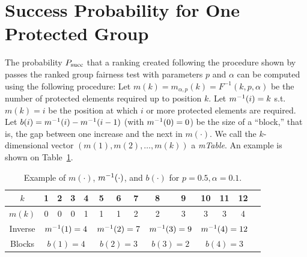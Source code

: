 \section{Success Probability for One Protected Group}\label{subsubsec:adjustment-binomial}

The probability $P_{\operatorname{succ}}$ that a ranking created following the procedure shown by~\citet{yang2016measuring} passes the ranked group fairness test with parameters $p$ and $\alpha$ can be computed using the following procedure:
%
Let $m(k) = m_{\alpha,p}(k) = F^{-1}(k,p,\alpha)$ be the number of protected elements required up to position $k$.
%
Let $m^{-1}(i) = k$ s.t. $m(k) = i$ be the position at which $i$ or more protected elements are required.
%
Let $b(i) = m^{-1}(i) - m^{-1}(i-1)$ (with $m^{-1}(0) = 0$) be the size of a ``block,'' that is, the gap between one increase and the next in $m(\cdot)$.
%
We call the $k$-dimensional vector $(m(1), m(2), \ldots , m(k))$ a \emph{mTable}.
%
An example is shown on Table~\ref{tbl:05:example_blocks}.
%
\begin{table}[ht!]
	\centering
	\begin{tabular}{cccccccccccccc}\toprule
		$k$    & 1 & 2 & 3 & \textbf{{4}} & 5 & 6 & \textbf{7} & 8 & \textbf{9} & 10 & 11 & \textbf{12} \\
		\midrule
		$m(k)$ & 0 & 0 & 0 & \multicolumn{1}{c|}{1} & 1 & 1 & \multicolumn{1}{c|}{2} & 2 & \multicolumn{1}{c|}{3} & 3  & 3  & \multicolumn{1}{c}{4}\\
		Inverse   & \multicolumn{4}{c|}{$m^{-1}(1)=4$}
		& \multicolumn{3}{c|}{$m^{-1}(2)=7$}
		& \multicolumn{2}{c|}{$m^{-1}(3)=9$}
		& \multicolumn{3}{c}{$m^{-1}(4)=12$}\\
		Blocks       & \multicolumn{4}{c|}{$b(1)=4$}
		& \multicolumn{3}{c|}{$b(2)=3$}
		& \multicolumn{2}{c|}{$b(3)=2$}
		& \multicolumn{3}{c}{$b(4)=3$}\\
		\bottomrule
	\end{tabular}
	\caption[Example of different block sizes]{Example of $m(\cdot)$, $m^{-1}(\cdot)$, and $b(\cdot)$ for $p=0.5, \alpha=0.1$.}
	\label{tbl:05:example_blocks}
\end{table}

